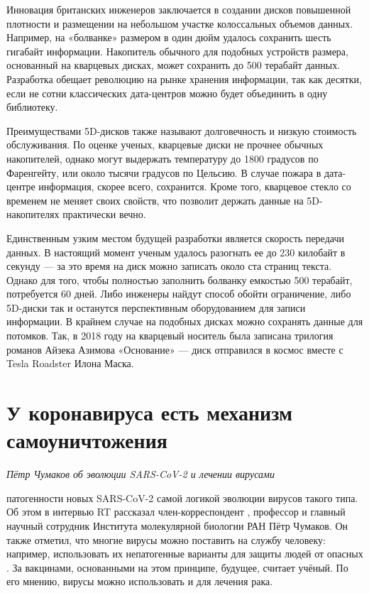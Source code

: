 Инновация британских инженеров заключается в создании дисков повышенной плотности и размещении на небольшом участке колоссальных объемов данных. Например, на «болванке» размером в один дюйм удалось сохранить шесть гигабайт информации. Накопитель обычного для подобных устройств размера, основанный на кварцевых дисках, может сохранить до 500 терабайт данных. Разработка обещает революцию на рынке хранения информации, так как десятки, если не сотни классических дата-центров можно будет объединить в одну библиотеку.

Преимуществами 5D-дисков также называют долговечность и низкую стоимость обслуживания. По оценке ученых, кварцевые диски не прочнее обычных накопителей, однако могут выдержать температуру до 1800 градусов по Фаренгейту, или около тысячи градусов по Цельсию. В случае пожара в дата-центре информация, скорее всего, сохранится. Кроме того, кварцевое стекло со временем не меняет своих свойств, что позволит держать данные на 5D-накопителях практически вечно.

Единственным узким местом будущей разработки является скорость передачи данных. В настоящий момент ученым удалось разогнать ее до 230 килобайт в секунду --- за это время на диск можно записать около ста страниц текста. Однако для того, чтобы полностью заполнить болванку емкостью 500 терабайт, потребуется 60 дней. Либо инженеры найдут способ обойти ограничение, либо 5D-диски так и останутся перспективным оборудованием для записи информации. В крайнем случае на подобных дисках можно сохранять данные для потомков. Так, в 2018 году на кварцевый носитель была записана трилогия романов Айзека Азимова «Основание» --- диск отправился в космос вместе с Tesla Roadster Илона Маска.



\section{У коронавируса есть механизм самоуничтожения}
\textit{Пётр Чумаков об эволюции SARS-CoV-2 и лечении вирусами}

 патогенности новых  SARS-CoV-2  самой логикой эволюции вирусов такого типа. Об этом в интервью RT рассказал член-корреспондент , профессор и главный научный сотрудник Института молекулярной биологии РАН Пётр Чумаков. Он также отметил, что многие вирусы можно поставить на службу человеку: например, использовать их непатогенные варианты для защиты людей от опасных . За вакцинами, основанными на этом принципе, будущее, считает учёный. По его мнению, вирусы можно использовать и для лечения рака.

